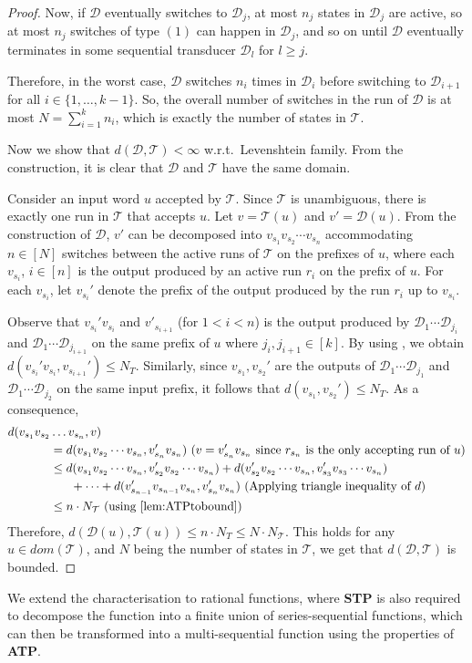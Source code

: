 \documentclass[a4paper,UKenglish,cleveref, autoref, thm-restate,authorcolumns, colorlinks]{lipics-v2021}
\newcommand\dom{\mathit{dom}}
\newcommand\calD{\mathcal{D}}
\newcommand\calT{\mathcal{T}}
\newcommand{\ATP}[0]{\textbf{ATP}}
\newcommand{\STP}[0]{\textbf{STP}}
\begin{document}
{\begin{proof}
     
     Now, if $\calD$ eventually switches to $\calD_j$, at most $n_j$ states in $\calD_j$ are active, so at most $n_j$ switches of type $(1)$ can happen in $\calD_j$, and so on until $\calD$ eventually terminates in some sequential transducer $\calD_l$ for $l\geq j$. 

Therefore, in the worst case, $\calD$ switches $n_i$ times in $\calD_i$ before switching to $\calD_{i+1}$ for all $i\in\{1,\dots,k-1\}$. So, the overall number of switches in the run of $\calD$ is at most $N = \sum_{i=1}^{k} n_i$, which is exactly the number of states in $\calT$.

    Now we show that $d(\calD,\calT) < \infty$ w.r.t.~Levenshtein family. From the construction, it is clear that $\calD$ and $\calT$ have the same domain.
   
    Consider an input word $u$ accepted by $\calT$. Since $\calT$ is unambiguous,
    there is exactly one run in $\calT$ that accepts $u$.
    Let $v = \calT(u)$ and $v' = \calD(u)$.
    From the construction of $\calD$, $v'$ can be decomposed into $v_{s_1}v_{s_2} \cdots v_{s_n}$ accommodating $n \in [N]$ switches between the active runs of $\calT$ on the prefixes of $u$, where each $v_{s_i}$, $i \in [n]$ is the output produced by an active run $r_i$ on the prefix of $u$. For each $v_{s_i}$, let $v_{s_i}'$ denote the prefix of the output produced by the run $r_i$ up to $v_{s_i}$. 
    
    Observe that $v_{s_i}'v_{s_i}$ and $v'_{s_{i+1}}$ (for $1 < i < n$) is the output produced by $\calD_1 \cdots \calD_{j_i}$ and $\calD_1 \cdots \calD_{j_{i+1}}$ on the same prefix of $u$ where $j_i,j_{i+1} \in [k]$. 
    By using , we obtain $d(v_{s_i}'v_{s_i},v_{s_{i+1}}') \leq N_T$. Similarly,  since $v_{s_1},v_{s_2}'$ are the outputs of $\calD_1 \cdots \calD_{j_1}$ and $\calD_1 \cdots \calD_{j_2}$ on the same input prefix, it follows that $d(v_{s_1},v_{s_2}') \leq N_T$. As a consequence,
     \begin{align*}
     d(v_{s_1}v_{s_2}& \ldots v_{s_n},v) \\
     &= d(v_{s_1}v_{s_2} \cdots v_{s_n},v_{s_n}'v_{s_n}) \text{ ($v=v_{s_n}'v_{s_n}$ since $r_{s_n}$ is the only accepting run of $u$)}\\
     &\leq d(v_{s_1}v_{s_2} \cdots v_{s_n},v_{s_2}'v_{s_2} \cdots v_{s_n}) + d(v_{s_2}'v_{s_2} \cdots v_{s_n},v_{s_3}'v_{s_3} \cdots v_{s_n})\\
     & \hspace{0.6cm} + \cdots + d(v_{s_{n-1}}'v_{s_{n-1}}v_{s_n},v_{s_n}'v_{s_n}) \text{ (Applying triangle inequality of $d$)}\\
     &\leq n \cdot N_\calT \text{ (using \Cref{lem:ATPtobound})}
    \end{align*}
Therefore, $d(\calD(u),\calT(u))\leq n\cdot N_T\leq N\cdot N_\calT$. This holds for any $u\in\dom(\calT)$, and $N$ being the number of states in $\calT$, we get that $d(\calD,\calT)$ is bounded.
\end{proof}
We extend the characterisation to rational functions, where \STP{} is also required to decompose the function into a finite union of series-sequential functions, which can then be transformed into a multi-sequential function using the properties of \ATP{}. 

}
\end{document}
